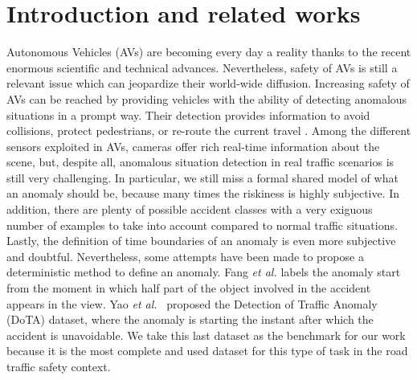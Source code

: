 \section{Introduction and related works}

Autonomous Vehicles (AVs) are becoming every day a reality thanks to the recent enormous scientific and technical advances.
Nevertheless, safety of AVs is still a relevant issue which can jeopardize their world-wide diffusion.
Increasing safety of AVs can be reached by providing vehicles with the ability of detecting anomalous situations in a prompt way.
Their detection provides information to avoid collisions, protect pedestrians, or re-route the current travel \cite{4298901}.
Among the different sensors exploited in AVs, cameras offer rich real-time information about the scene, but, despite all, anomalous situation detection in real traffic scenarios is still very challenging.
In particular, we still miss a formal shared model of what an anomaly should be, because many times the riskiness is highly subjective.
In addition, there are plenty of possible accident classes with a very exiguous number of examples to take into account compared to normal traffic situations.
Lastly, the definition of time boundaries of an anomaly is even more subjective and doubtful.
Nevertheless, some attempts have been made to propose a deterministic method to define an anomaly.
Fang \emph{et al.} \cite{fang2019dada} labels the anomaly start from the moment in which half part of the object involved in the accident appears in the view.
Yao \emph{et al.}~\cite{9712446} proposed the Detection of Traffic Anomaly (DoTA) dataset, 
where the anomaly is starting the instant after which the accident is unavoidable. %
We take this last dataset as the benchmark for our work because it is the most complete and used dataset for this type of task in the road traffic safety context.

